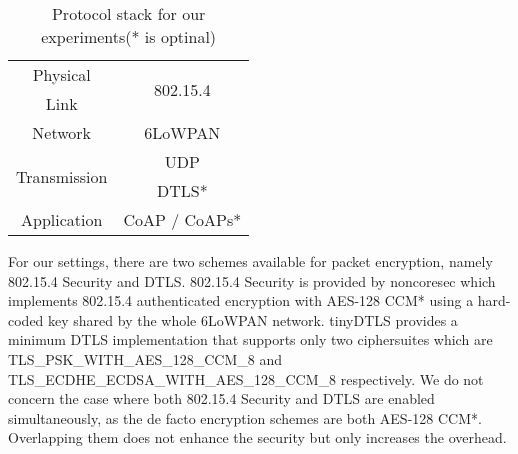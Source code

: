 \begin{table}[!h]
	\centering
	\begin{tabular}{|c|c|}
	\hline
	Physical                        & \multirow{2}{*}{802.15.4} \\ \cline{1-1}
	Link                          &                           \\ \hline
	Network                       & 6LoWPAN                   \\ \hline
	\multirow{2}{*}{Transmission} & UDP                       \\ \cline{2-2} 
	                              & DTLS*                     \\ \hline
	Application                   & CoAP / CoAPs*             \\ \hline
	\end{tabular}
	\caption{Protocol stack for our experiments(* is optinal)\label{Protocols}}
\end{table}


For our settings, there are two schemes available for packet encryption, namely 802.15.4 Security\cite{802154} and DTLS\cite{rfc6347}. 802.15.4 Security is provided by noncoresec\cite{noncoresec} which implements 802.15.4 authenticated encryption with AES-128 CCM*\cite{CCM} using a hard-coded key shared by the whole 6LoWPAN network. tinyDTLS\cite{tinydtls} provides a minimum DTLS implementation that supports only two ciphersuites which are TLS\_PSK\_WITH\_AES\_128\_CCM\_8\cite{rfc6655} and TLS\_ECDHE\_ECDSA\_WITH\_AES\_128\_CCM\_8\cite{rfc6655} respectively. We do not concern the case where both 802.15.4 Security and DTLS are enabled simultaneously, as the de facto encryption schemes are both AES-128 CCM*. Overlapping them does not enhance the security but only increases the overhead.
